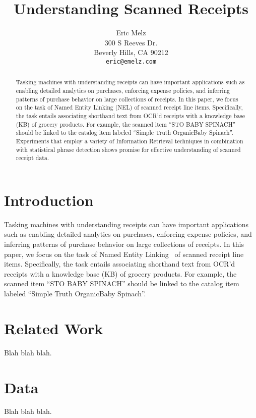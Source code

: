 \documentclass[11pt,a4paper]{article}
\title{Understanding Scanned Receipts}
\author{Eric Melz \\
  300 S Reeves Dr. \\
  Beverly Hills, CA 90212 \\
  \texttt{eric@emelz.com}
}
\date{}
\begin{document}
\maketitle
\begin{abstract}
Tasking machines with understanding receipts can have important
applications such as enabling detailed analytics on purchases,
enforcing expense policies, and inferring patterns of purchase
behavior on large collections of receipts.  In this paper, we focus on
the task of Named Entity Linking (NEL) of 
scanned receipt line items.  Specifically, the task entails
associating shorthand text from OCR’d receipts with a knowledge base
(KB) of grocery products.  For example, the scanned item ``STO BABY
SPINACH'' should be linked to the catalog item labeled ``Simple Truth
Organic\texttrademark Baby Spinach''.  Experiments that employ a variety of
Information Retrieval techniques in combination with statistical
phrase detection shows promise for effective understanding of scanned
receipt data.

\end{abstract}

\section{Introduction}

Tasking machines with understanding receipts can have important
applications such as enabling detailed analytics on purchases,
enforcing expense policies, and inferring patterns of purchase
behavior on large collections of receipts.  In this paper, we focus on
the task of Named Entity Linking~\cite{Hachey:2012} of
scanned receipt line items.  Specifically, the task entails
associating shorthand text from OCR’d receipts with a knowledge base
(KB) of grocery products.  For example, the scanned item ``STO BABY
SPINACH'' should be linked to the catalog item labeled ``Simple Truth
Organic\texttrademark Baby Spinach''.  

\section{Related Work}

Blah blah blah.

\section{Data}

Blah blah blah.
\end{document}
